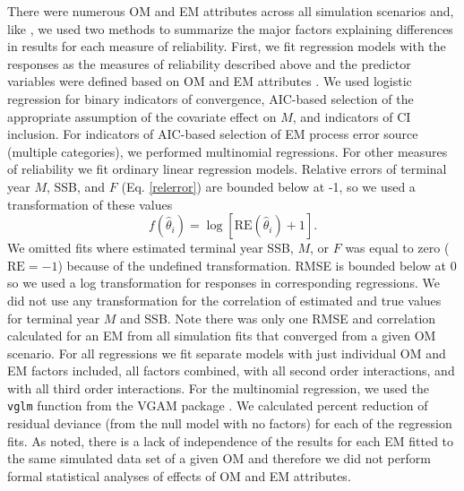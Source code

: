 \documentclass[
  12pt,
]{article}
\begin{document}
There were numerous OM and EM attributes across all simulation scenarios
and, like \citet{milleretal26}, we used two methods to summarize the
major factors explaining differences in results for each measure of
reliability. First, we fit regression models with the responses as the
measures of reliability described above and the predictor variables were
defined based on OM and EM attributes
\citep[e.g.,][]{mackinnonetal95, wangetal17, harwelletal18}. We used
logistic regression for binary indicators of convergence, AIC-based
selection of the appropriate assumption of the covariate effect on
\(M\), and indicators of CI inclusion. For indicators of AIC-based
selection of EM process error source (multiple categories), we performed
multinomial regressions. For other measures of reliability we fit
ordinary linear regression models. Relative errors of terminal year
\(M\), SSB, and \(F\) (Eq. \ref{relerror}) are bounded below at -1, so
we used a transformation of these values
\begin{equation}\label{relerror_trans_response}
f\left(\widehat \theta_i\right)  = \log\left[\text{RE}\left(\widehat \theta_i\right)+1\right].
\end{equation} We omitted fits where estimated terminal year SSB, \(M\),
or \(F\) was equal to zero (\(\text{RE} = -1\)) because of the undefined
transformation. RMSE is bounded below at 0 so we used a log
transformation for responses in corresponding regressions. We did not
use any transformation for the correlation of estimated and true values
for terminal year \(M\) and SSB. Note there was only one RMSE and
correlation calculated for an EM from all simulation fits that converged
from a given OM scenario. For all regressions we fit separate models
with just individual OM and EM factors included, all factors combined,
with all second order interactions, and with all third order
interactions. For the multinomial regression, we used the \verb|vglm|
function from the VGAM package \citep{yee08, yee15}. We calculated
percent reduction of residual deviance (from the null model with no
factors) for each of the regression fits. As \citet{milleretal26} noted,
there is a lack of independence of the results for each EM fitted to the
same simulated data set of a given OM and therefore we did not perform
formal statistical analyses of effects of OM and EM attributes.
\end{document}
